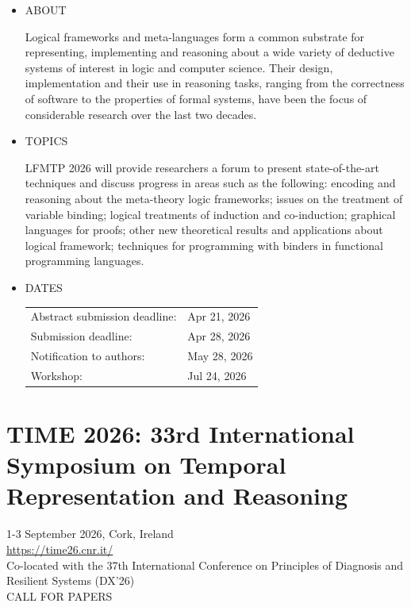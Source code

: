 \documentclass[prodmode,acmtecs]{acmsmall} %
\begin{document}
\begin{itemize}\item  ABOUT 
 
  Logical frameworks and meta-languages form a common substrate for representing, implementing and reasoning about a wide variety of deductive systems of interest in logic and computer science. Their design, implementation and their use in reasoning tasks, ranging from the correctness of software to the properties of formal systems, have been the focus of considerable research over the last two decades. 
 
\item  TOPICS 
 
  LFMTP 2026 will provide researchers a forum to present state-of-the-art techniques and discuss progress in areas such as the following: encoding and reasoning about the meta-theory logic frameworks; issues on the treatment of variable binding; logical treatments of induction and co-induction; graphical languages for proofs; other new theoretical results and applications about logical framework; techniques for programming with binders in functional programming languages. 
 
\item  DATES 
 
\begin{tabulary}{\linewidth}{LL}Abstract submission deadline:  & Apr 21, 2026 \\
Submission deadline:  & Apr 28, 2026 \\
Notification to authors:  & May 28, 2026 \\
Workshop:  & Jul 24, 2026 \\
\end{tabulary}
 
\end{itemize}\section{TIME 2026: 33rd International Symposium on Temporal Representation and Reasoning }\label{TIME2026}  1-3 September 2026, Cork, Ireland\\ 
  \href{https://time26.cnr.it/}{https://time26.cnr.it/}\\ 
  Co-located with the 37th International Conference on Principles of Diagnosis and Resilient Systems (DX’26)\\ 
CALL FOR PAPERS 
\end{document}

